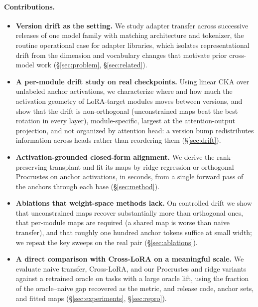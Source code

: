 \paragraph{Contributions.}
\begin{itemize}
  \item \textbf{Version drift as the setting.} We study adapter transfer across
        successive releases of one model family with matching architecture and
        tokenizer, the routine operational case for adapter libraries, which
        isolates representational drift from the dimension and vocabulary
        changes that motivate prior cross-model work (\S\ref{sec:problem},
        \S\ref{sec:related}).
  \item \textbf{A per-module drift study on real checkpoints.} Using linear CKA
        over unlabeled anchor activations, we characterize where and how much
        the activation geometry of LoRA-target modules moves between versions,
        and show that the drift is non-orthogonal (unconstrained maps beat the
        best rotation in every layer), module-specific, largest at the
        attention-output projection, and not organized by attention head: a
        version bump redistributes information across heads rather than
        reordering them (\S\ref{sec:drift}).
  \item \textbf{Activation-grounded closed-form alignment.} We derive the
        rank-preserving transplant and fit its maps by ridge regression or
        orthogonal Procrustes on anchor activations, in seconds, from a single
        forward pass of the anchors through each base (\S\ref{sec:method}).
  \item \textbf{Ablations that weight-space methods lack.} On controlled drift
        we show that unconstrained maps recover substantially more than
        orthogonal ones, that per-module maps are required (a shared map is
        worse than naive transfer), and that roughly one hundred anchor tokens
        suffice at small width; we repeat the key sweeps on the real pair
        (\S\ref{sec:ablations}).
  \item \textbf{A direct comparison with Cross-LoRA on a meaningful scale.} We
        evaluate naive transfer, Cross-LoRA, and our Procrustes and ridge
        variants against a retrained oracle on tasks with a large oracle lift,
        using the fraction of the oracle--naive gap recovered as the metric,
        and release code, anchor sets, and fitted maps (\S\ref{sec:experiments},
        \S\ref{sec:repro}).
\end{itemize}
